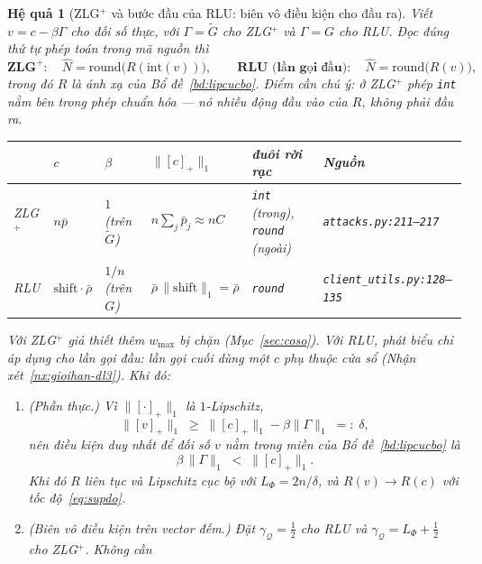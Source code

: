 \documentclass[11pt]{article}
\newtheorem{hequa}[dinhly]{Hệ quả}
\theoremstyle{remark}
\newcommand{\pos}[1]{\left[#1\right]_+}
\begin{document}
\begin{hequa}[ZLG$^+$ và bước đầu của RLU: biên vô điều kiện cho đầu ra]
\label{hq:apdung}
Viết $v = c - \beta\Gamma$ cho đối số thực, với $\Gamma = \tilde G$ cho
ZLG$^+$ và $\Gamma = G$ cho RLU. Đọc đúng thứ tự phép toán trong mã nguồn thì
\begin{equation}
 \textbf{ZLG}^+:\quad \widehat N = \mathrm{round}\bigl(R(\mathrm{int}(v))\bigr),
 \qquad
 \textbf{RLU (lần gọi đầu)}:\quad \widehat N = \mathrm{round}\bigl(R(v)\bigr),
 \label{eq:phantich}
\end{equation}
trong đó $R$ là ánh xạ của Bổ đề~\ref{bd:lipcucbo}. Điểm cần chú ý: ở
ZLG$^+$ phép \texttt{int} nằm \emph{bên trong} phép chuẩn hóa --- nó nhiễu
động \emph{đầu vào} của $R$, không phải đầu ra.
\begin{center}
\footnotesize
\begin{tabular}{@{}llllll@{}}
\toprule
& $c$ & $\beta$ & $\|\pos{c}\|_1$ & đuôi rời rạc & Nguồn \\
\midrule
ZLG$^+$ & $n\bar p$ & $1$ (trên $\tilde G$)
 & $n\sum_j \bar p_j \approx nC$
 & \texttt{int} (trong), \texttt{round} (ngoài) & \texttt{attacks.py:211--217} \\
RLU & $\mathrm{shift}\cdot\bar\rho$ & $1/n$ (trên $G$)
 & $\bar\rho\,\|\mathrm{shift}\|_1 = \bar\rho$
 & \texttt{round} & \texttt{client\_utils.py:128--135} \\
\bottomrule
\end{tabular}
\end{center}
Với ZLG$^+$ giả thiết thêm $w_{\max}$ bị chặn (Mục~\ref{sec:coso}). Với RLU,
phát biểu chỉ áp dụng cho \emph{lần gọi đầu}: lần gọi cuối dùng một $c$ phụ
thuộc cửa sổ (Nhận xét~\ref{nx:gioihan-dl3}). Khi đó:
\begin{enumerate}
\item[(i)] \textup{(Phần thực.)} Vì $\|\pos{\cdot}\|_1$ là $1$-Lipschitz,
 \[
  \|\pos{v}\|_1 \;\ge\; \|\pos{c}\|_1 - \beta\|\Gamma\|_1 \;=:\; \delta ,
 \]
 nên \emph{điều kiện duy nhất} để đối số $v$ nằm trong miền của
 Bổ đề~\ref{bd:lipcucbo} là
 \begin{equation}
  \beta\,\|\Gamma\|_1 \;<\; \|\pos{c}\|_1 .
  \label{eq:dieukienmien}
 \end{equation}
 Khi đó $R$ liên tục và Lipschitz cục bộ với $L_\Phi = 2n/\delta$, và
 $R(v) \to R(c)$ với tốc độ~\eqref{eq:supdo}.
\item[(ii)] \textup{(Biên vô điều kiện trên vector đếm.)} Đặt
 $\gamma_{\mathcal{Q}} = \tfrac12$ cho RLU và
 $\gamma_{\mathcal{Q}} = L_\Phi + \tfrac12$ cho ZLG$^+$. \emph{Không cần
}
\end{enumerate}
\end{hequa}
\end{document}
